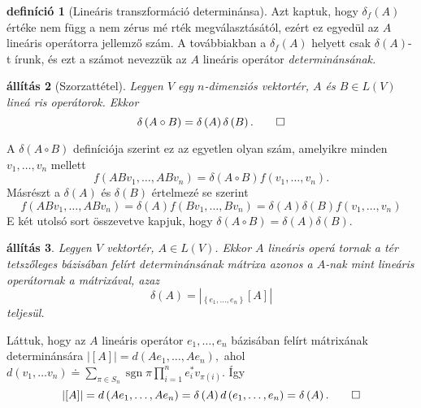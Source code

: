 \documentclass[9pt, a4paper, showtrims]{memoir}
\makeatletter
\renewenvironment{proof}[1][\proofname]
    {\par\pushQED{\qed}%
    \normalfont \topsep6\p@\@plus6\p@\relax
    \trivlist
    \item[\hskip\labelsep
        \itshape
    #1\@addpunct{:}]\ignorespaces}
    {\popQED\endtrivlist\@endpefalse}
\theoremstyle{plain}
\newtheorem{proposition}{állítás}[chapter]
\theoremstyle{remark}
\theoremstyle{definition}
\newtheorem{definition}[proposition]{definíció}
\makeatother
\begin{document}
%

\begin{definition}[Lineáris transzformáció determinánsa]
Azt kaptuk, hogy $\delta _{f}\left( A\right) $ értéke nem függ a nem zérus mé%
rték megválasztásától, ezért ez egyedül az $A$ lineáris operátorra jellemző
szám. A továbbiakban a $\delta _{f}\left( A\right) $ helyett csak $\delta
\left( A\right) $-t írunk, és ezt a számot nevezzük az $A$ lineáris operátor 
\emph{determinánsának.}
\end{definition}


\begin{proposition}[Szorzattétel]
Legyen $V$ egy $n$-dimenziós vektortér, $A$ és $B\in L\left( V\right) $ lineá%
ris operátorok. Ekkor 
\[
\delta \left( A\circ B\right) =\delta \left( A\right) \delta \left( B\right)
. \qedhere
\]
\end{proposition}

\begin{proof}
A $\delta \left( A\circ B\right) $ definíciója szerint ez az egyetlen olyan
szám, amelyikre minden $v_{1},\ldots ,v_{n}$ mellett 
\[
f\left( ABv_{1},\ldots ,ABv_{n}\right) =\delta \left( A\circ B\right)
f\left( v_{1},\ldots ,v_{n}\right) . 
\]
Másrészt a $\delta \left( A\right) $ és $\delta \left( B\right) $ értelmezé%
se szerint 
\[
f\left( ABv_{1},\ldots ,ABv_{n}\right) =\delta \left( A\right) f\left(
Bv_{1},\ldots ,Bv_{n}\right) =\delta \left( A\right) \delta \left( B\right)
f\left( v_{1},\ldots ,v_{n}\right) 
\]
E két utolsó sort összevetve kapjuk, hogy $\delta \left( A\circ B\right)
=\delta \left( A\right) \delta \left( B\right) .$
\end{proof}

\begin{proposition}
Legyen $V$ vektortér, $A\in L\left( V\right) $. Ekkor $A$ lineáris operá%
tornak a tér tetszőleges bázisában felírt determinánsának mátrixa azonos a $%
A $-nak mint lineáris operátornak a mátrixával, azaz 
\[
\delta \left( A\right) =\left| _{\left\{ e_{1},\ldots ,e_{n}\right\} }\left[
A\right] \right| 
\]
teljesül.
\end{proposition}

\begin{proof}
Láttuk, hogy az $A$ lineáris operátor $e_{1},\ldots ,e_{n}$ bázisában felírt
mátrixának determinánsára $\left| \left[ A\right] \right| =d\left(
Ae_{1},\ldots ,Ae_{n}\right) ,$ ahol $d\left( v_{1},\ldots v_{n}\right)
\doteq \sum_{\pi \in S_{n}}%
\operatorname{sgn}\pi \prod_{i=1}^{n}e_{i}^{\ast }v_{\pi \left( i\right) }.$ Így 
\[
\left| \left[ A\right] \right| =d\left( Ae_{1},\ldots ,Ae_{n}\right) =\delta
\left( A\right) d\left( e_{1},\ldots ,e_{n}\right) =\delta \left( A\right) . \qedhere
\]
\end{proof}
\end{document}
